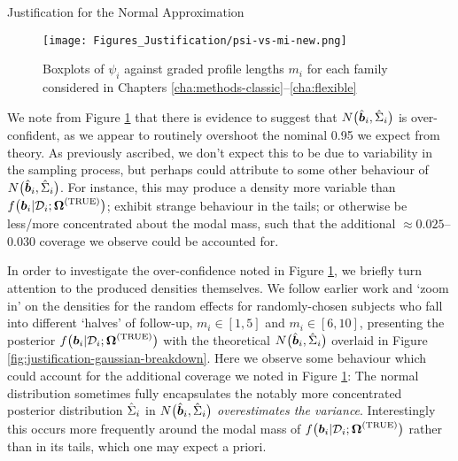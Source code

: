 \begin{chapter}{\label{cha:justification}Justification for the Normal Approximation}
  \begin{figure}[th]
      \centering
      \texttt{[image: Figures\_Justification/psi-vs-mi-new.png]}
      \caption{Boxplots of $\psi_i$ against graded profile lengths $m_i$ for each family considered in Chapters \ref{cha:methods-classic}--\ref{cha:flexible}}
      \label{fig:justification-psi-mi-families}
  \end{figure}
  
  We note from Figure \ref{fig:justification-psi-mi-families} that there is evidence to suggest that $N\big(\hat{\bm{b}}_i,\hat{\Sigma}_i\big)$ is over-confident, as we appear to routinely overshoot the nominal 0.95 we expect from theory. As previously ascribed, we don't expect this to be due to variability in the sampling process, but perhaps could attribute to some other behaviour of $N\big(\hat{\bm{b}}_i,\hat{\Sigma}_i\big)$. For instance, this may produce a density more variable than $f\big(\bm{b}_i|\mathcal{D}_i;\bm{\mathrm{\Omega}}^{(\mathrm{TRUE})}\big)$; exhibit strange behaviour in the tails; or otherwise be less/more concentrated about the modal mass, such that the additional $\approx0.025$--$0.030$ coverage we observe could be accounted for. 


  In order to investigate the over-confidence noted in Figure \ref{fig:justification-psi-mi-families}, we briefly turn attention to the produced densities themselves. We follow earlier work \citep{Murray2023} and `zoom in' on the densities for the random effects for randomly-chosen subjects who fall into different `halves' of follow-up, $m_i\in[1,5]$ and $m_i\in[6,10]$, presenting the posterior $f\big(\bm{b}_i|\mathcal{D}_i;\bm{\mathrm{\Omega}}^{(\mathrm{TRUE})}\big)$ with the theoretical $N\big(\hat{\bm{b}}_i,\hat{\Sigma}_i\big)$ overlaid in Figure \ref{fig:justification-gaussian-breakdown}. Here we observe some behaviour which could account for the additional coverage we noted in Figure \ref{fig:justification-psi-mi-families}: The normal distribution sometimes fully encapsulates the notably more concentrated posterior distribution \ie $\hat{\Sigma}_i$ in $N\big(\hat{\bm{b}}_i,\hat{\Sigma}_i\big)$ \textit{overestimates the variance}. Interestingly this occurs more frequently around the modal mass of $f\big(\bm{b}_i|\mathcal{D}_i;\bm{\mathrm{\Omega}}^{(\mathrm{TRUE})}\big)$ rather than in its tails, which one may expect a priori.


\end{chapter}

